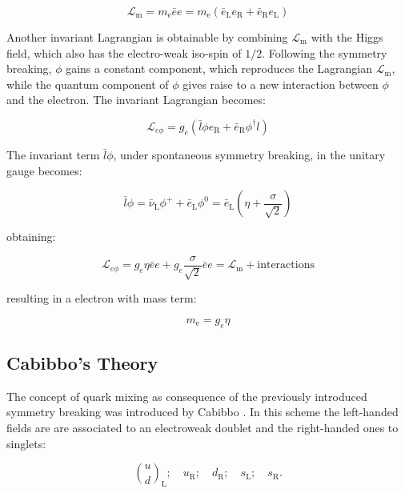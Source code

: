 \begin{equation}
\mathcal{L}_{\text{m}} = m_{\text{e}}\bar{e}e = m_{\text{e}}(\bar{e}_{\text{L}}e_{\text{R}} + \bar{e}_{\text{R}}e_{\text{L}})
\end{equation}

Another invariant Lagrangian is obtainable by combining $\mathcal{L}_{\text{m}}$ with the Higgs field, which also has the electro-weak iso-spin of $1/2$. Following the symmetry breaking, $\phi$ gains a constant component, which reproduces the Lagrangian  $\mathcal{L}_{\text{m}}$, while the quantum component of $\phi$ gives raise to a new interaction between $\phi$ and the electron. The invariant Lagrangian becomes:

\begin{equation}
\mathcal{L}_{e\phi} = g_{e} (\bar{l}\phi e_{\text{R}} + \bar{e}_{\text{R}}\phi^{\dagger}l)
\end{equation}

The invariant term $\bar{l}\phi$, under spontaneous symmetry breaking, in the unitary gauge becomes:

\begin{equation}
\bar{l}\phi = \bar{\nu}_{\text{L}}\phi^{+} + \bar{e}_{\text{L}}\phi^{0} = \bar{e}_{\text{L}}\left(\eta + \dfrac{\sigma}{\sqrt{2}}\right)
\end{equation}

obtaining:

\begin{equation}
\mathcal{L}_{e\phi} = g_{e}\eta\bar{e}e + g_{e} \dfrac{\sigma}{\sqrt{2}}\bar{e}e = \mathcal{L}_{\text{m}} + \text{interactions}
\end{equation}

resulting in a electron with mass term:

\begin{equation}
m_{\text{e}} = g_{e}\eta
\end{equation}

\subsection{Cabibbo's Theory}

The concept of quark mixing as consequence of the previously introduced symmetry breaking was introduced by Cabibbo \cite{PhysRevLett.10.531}. In this scheme the left-handed fields are are associated to an electroweak doublet and the right-handed ones to singlets:

\begin{equation}
\binom{u}{d}_{\text{L}}; \quad u_{\text{R}}; \quad d_{\text{R}}; \quad s_{\text{L}}; \quad s_{\text{R}}.
\end{equation}

